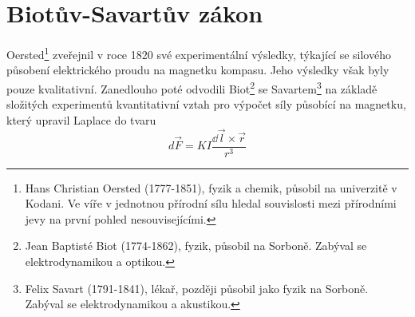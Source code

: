   \section{Biotův-Savartův zákon}\label{ES:sec10}
    Oersted\footnote{Hans Christian Oersted (1777-1851), fyzik a chemik, působil na univerzitě v 
    Kodani. Ve víře v jednotnou přírodní sílu hledal souvislosti mezi přírodními jevy na první 
    pohled nesouvisejícími.} zveřejnil v roce 1820 své experimentální výsledky, týkající se 
    silového působení elektrického proudu na magnetku kompasu. Jeho výsledky však byly pouze 
    kvalitativní. Zanedlouho poté odvodili Biot\footnote{Jean Baptisté Biot (1774-1862), fyzik, 
    působil na Sorboně. Zabýval se elektrodynamikou a optikou.} se Savartem\footnote{Felix Savart 
    (1791-1841), lékař, později působil jako fyzik na Sorboně. Zabýval se elektrodynamikou a 
    akustikou.} na základě složitých experimentů kvantitativní vztah pro výpočet síly působící na 
    magnetku, který upravil Laplace do tvaru
    \begin{equation}\label{ES:eq_zakl_elm63}
      d\vec{F} = KI\frac{\dd{\vec{l}}\times \vec{r}}{r^3}
    \end{equation} 
    
